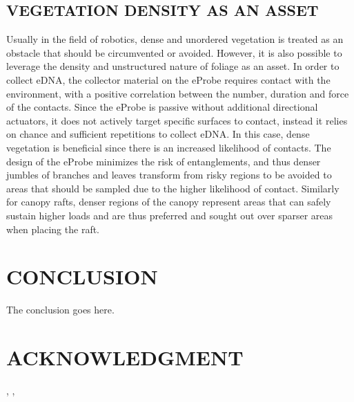     \subsection{VEGETATION DENSITY AS AN ASSET}
    Usually in the field of robotics, dense and unordered vegetation is treated as an obstacle that should be circumvented or avoided. However, it is also possible to leverage the density and unstructured nature of foliage as an asset. In order to collect eDNA, the collector material on the eProbe requires contact with the environment, with a positive correlation between the number, duration and force of the contacts. Since the eProbe is passive without additional directional actuators, it does not actively target specific surfaces to contact, instead it relies on chance and sufficient repetitions to collect eDNA. In this case, dense vegetation is beneficial since there is an increased likelihood of contacts. The design of the eProbe minimizes the risk of entanglements, and thus denser jumbles of branches and leaves transform from risky regions to be avoided to areas that should be sampled due to the higher likelihood of contact.
    Similarly for canopy rafts, denser regions of the canopy represent areas that can safely sustain higher loads and are thus preferred and sought out over sparser areas when placing the raft. 
    

 
	\section{CONCLUSION}
	The conclusion goes here.
	
	\section*{ACKNOWLEDGMENT}
	, , 
	
% 	
% 	
	
	
	
% 
